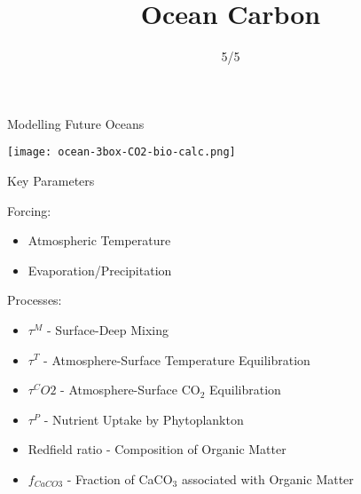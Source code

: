 

\title{Ocean Carbon}
\author{5/5}



\begin{frame}{Modelling Future Oceans}
    
    \texttt{[image: ocean-3box-CO2-bio-calc.png]}
        
\end{frame}


\begin{frame}{Key Parameters}
    
    Forcing:
    \begin{itemize}
        \item Atmospheric Temperature
        \item Evaporation/Precipitation
    \end{itemize}

    Processes:
    \begin{itemize}
        \item $\tau^M$ - Surface-Deep Mixing
        \item $\tau^T$ - Atmosphere-Surface Temperature Equilibration
        \item $\tau^CO2$ - Atmosphere-Surface CO$_2$ Equilibration
        \item $\tau^P$ - Nutrient Uptake by Phytoplankton
        \item Redfield ratio - Composition of Organic Matter
        \item $f_{CaCO3}$ - Fraction of CaCO$_3$ associated with Organic Matter
    \end{itemize}

\end{frame}




